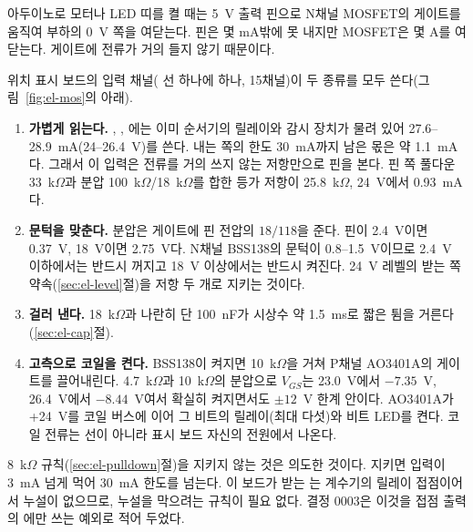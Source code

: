 \General 아두이노로 모터나 LED 띠를 켤 때는 5~V 출력 핀으로 N채널 MOSFET의 게이트를 움직여 부하의 0~V 쪽을 여닫는다.
핀은 몇 mA밖에 못 내지만 MOSFET은 몇 A를 여닫는다. 게이트에 전류가 거의 들지 않기 때문이다.

\Ours 위치 표시 보드의 입력 채널( 선 하나에 하나, 15채널)이 두 종류를 모두 쓴다(그림~\ref{fig:el-mos}의 아래).
\begin{enumerate}
\item \textbf{가볍게 읽는다.} , , 에는 이미 순서기의 릴레이와 감시 장치가 물려 있어
27.6--28.9~mA(24--26.4~V)를 쓴다. 내는 쪽의 한도 30~mA까지 남은 몫은 약 1.1~mA다. 그래서 이 입력은 전류를 거의 쓰지 않는 저항만으로 핀을 본다.
핀 쪽 풀다운 33~k$\Omega$과 분압 100~k$\Omega$/18~k$\Omega$를 합한 등가 저항이 25.8~k$\Omega$, 24~V에서 0.93~mA다.
\item \textbf{문턱을 맞춘다.} 분압은 게이트에 핀 전압의 $18/118$을 준다. 핀이 2.4~V이면 0.37~V, 18~V이면 2.75~V다.
N채널 BSS138의 문턱이 0.8--1.5~V이므로 2.4~V 이하에서는 반드시 꺼지고 18~V 이상에서는 반드시 켜진다. 24~V 레벨의
받는 쪽 약속(\ref{sec:el-level}절)을 저항 두 개로 지키는 것이다.
\item \textbf{걸러 낸다.} 18~k$\Omega$과 나란히 단 100~nF가 시상수 약 1.5~ms로 짧은 튐을 거른다(\ref{sec:el-cap}절).
\item \textbf{고측으로 코일을 켠다.} BSS138이 켜지면 10~k$\Omega$을 거쳐 P채널 AO3401A의 게이트를 끌어내린다. 4.7~k$\Omega$과
10~k$\Omega$의 분압으로 $V_{GS}$는 23.0~V에서 $-7.35$~V, 26.4~V에서 $-8.44$~V여서 확실히 켜지면서도 $\pm 12$~V 한계 안이다.
AO3401A가 +24~V를 코일 버스에 이어 그 비트의 릴레이(최대 다섯)와 비트 LED를 켠다. 코일 전류는  선이 아니라
표시 보드 자신의 전원에서 나온다.
\end{enumerate}
8~k$\Omega$ 규칙(\ref{sec:el-pulldown}절)을 지키지 않는 것은 의도한 것이다. 지키면 입력이 3~mA 넘게 먹어 30~mA 한도를
넘는다. 이 보드가 받는 는 계수기의 릴레이 접점이어서 누설이 없으므로, 누설을 막으려는 규칙이 필요 없다.
결정 0003은 이것을 접점 출력의 에만 쓰는 예외로 적어 두었다.

